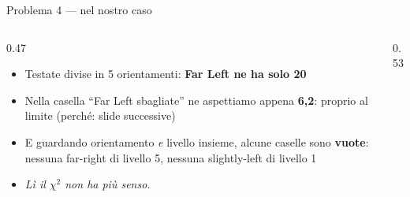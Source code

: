 \documentclass[aspectratio=169]{beamer}
\newcommand{\hl}[1]{\textbf{#1}}
\begin{document}
\begin{frame}{Problema 4 --- nel nostro caso}
  \begin{columns}[c]
    \begin{column}{0.47\textwidth}
      \begin{itemize}[<+->]
        \setlength\itemsep{0.7em}
        \item Testate divise in 5 orientamenti: \hl{Far Left ne ha solo 20}
        \item Nella casella ``Far Left sbagliate'' ne aspettiamo appena \hl{6,2}: proprio al limite (perch\'e: slide successive)
        \item E guardando orientamento \emph{e} livello insieme, alcune caselle sono \hl{vuote}: nessuna far-right di livello 5, nessuna slightly-left di livello 1
        \item[] {\small\itshape L\`i il $\chi^2$ non ha pi\`u senso.}
      \end{itemize}
    \end{column}
    \begin{column}{0.53\textwidth}
    \end{column}
  \end{columns}
\end{frame}
\end{document}
